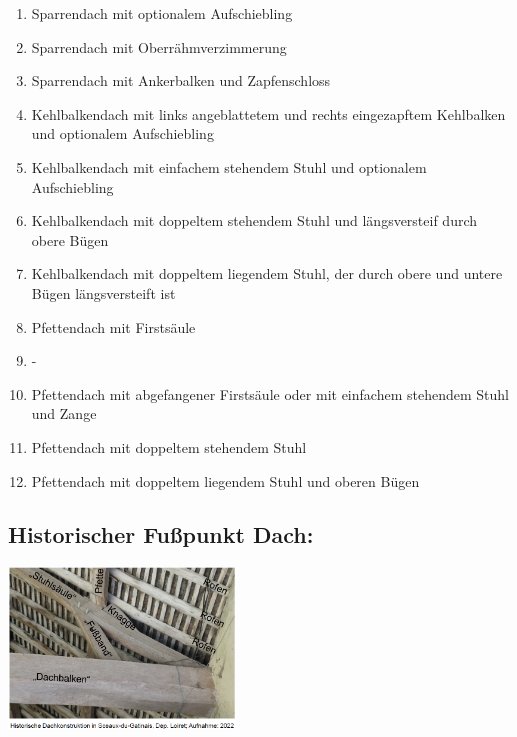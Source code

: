 \documentclass[fleqn,twoside]{article}
\begin{document}
        \begin{minipage}{0.55\textwidth}
            \begin{enumerate}[label=(\Alph*)]
                \item Sparrendach mit optionalem Aufschiebling
                \item Sparrendach mit Oberrähmverzimmerung
                \item Sparrendach mit Ankerbalken und Zapfenschloss
                \item Kehlbalkendach mit links angeblattetem und rechts eingezapftem Kehlbalken und optionalem Aufschiebling
                \item Kehlbalkendach mit einfachem stehendem Stuhl und optionalem Aufschiebling
                \item Kehlbalkendach mit doppeltem stehendem Stuhl und längsversteif durch obere Bügen
                \item Kehlbalkendach mit doppeltem liegendem Stuhl, der durch obere und untere Bügen längsversteift ist
                \item Pfettendach mit Firstsäule
                \item -
                \item Pfettendach mit abgefangener Firstsäule oder mit einfachem stehendem Stuhl und Zange
                \item Pfettendach mit doppeltem stehendem Stuhl
                \item Pfettendach mit doppeltem liegendem Stuhl und oberen Bügen
            \end{enumerate}
        \end{minipage}
            
    \subsection{Historischer Fußpunkt Dach:}
            \includegraphics[width=0.45\textwidth]{Grafiken/Daecher/Historischer_Fusspunkt_Dach.png}
\end{document}

